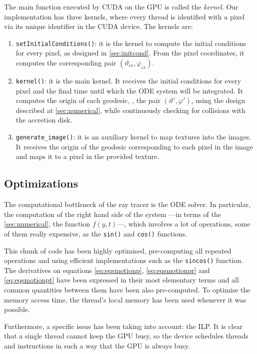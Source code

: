 The main function executed by \ac{CUDA} on the \ac{GPU} is called the \emph{kernel}. Our implementation has three kernels, where every thread is identified with a pixel via its unique identifier in the \ac{CUDA} device. The kernels are:
\begin{enumerate}
	\item \lstinline{setInitialConditions()}: it is the kernel to compute the initial conditions for every pixel, as designed in \autoref{sec:initcond}. From the pixel coordinates, it computes the corresponding pair $(\vartheta_{cs}, \varphi_{cs})$.
	\item  \lstinline{kernel()}: it is the main kernel. It receives the initial conditions for every pixel and the final time until which the \ac{ODE} system will be integrated. It computes the origin of each geodesic, \ie, the pair $(\vartheta', \varphi')$, using the design described at \autoref{sec:numerical}, while continuously checking for collisions with the accretion disk.
	\item \lstinline{generate_image()}: it is an auxiliary kernel to map textures into the images. It receives the origin of the geodesic corresponding to each pixel in the image and maps it to a pixel in the provided texture.
\end{enumerate}

\subsection{Optimizations}

The computational bottleneck of the ray tracer is the \ac{ODE} solver. In particular, the computation of the right hand side of the system ---in terms of the \autoref{sec:numerical}, the function $f(y,t)$---, which involves a lot of operations, some of them really expensive, as the \lstinline{sin()} and \lstinline{cos()} functions.

This chunk of code has been highly optimised, pre-computing all repeated operations and using efficient implementations such as the \lstinline{sincos()} function. The derivatives on equations \ref{eq:eqsmotionp}, \ref{eq:eqsmotionpr} and \ref{eq:eqsmotionpt} have been expressed in their most elementary terms and all common quantities between them have been also pre-computed. To optimise the memory access time, the thread's local memory has been used whenever it was possible.

Furthermore, a specific issue has been taking into account: the \ac{ILP}. It is clear that a single thread cannot keep the \ac{GPU} busy, so the device schedules threads and instructions in such a way that the \ac{GPU} is always busy.

